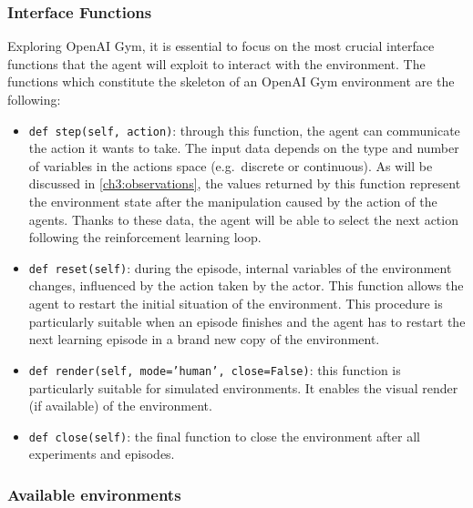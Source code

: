 \subsubsection{Interface Functions}

Exploring OpenAI Gym, it is essential to focus on the most crucial interface functions that the agent will exploit to interact with the environment.
The functions which constitute the skeleton of an OpenAI Gym environment are the following:
\begin{itemize}
	\item \texttt{def step(self, action)}: through this function, the agent can communicate the action it wants to take. The input data depends on the type and number of variables in the actions space (e.g.\ discrete or continuous). As will be discussed in \vref{ch3:observations}, the values returned by this function represent the environment state after the manipulation caused by the action of the agents. Thanks to these data, the agent will be able to select the next action following the reinforcement learning loop.
	\item \texttt{def reset(self)}: during the episode, internal variables of the environment changes, influenced by the action taken by the actor. This function allows the agent to restart the initial situation of the environment. This procedure is particularly suitable when an episode finishes and the agent has to restart the next learning episode in a brand new copy of the environment.
	\item \texttt{def render(self, mode='human', close=False)}: this function is particularly suitable for simulated environments. It enables the visual render (if available) of the environment.
	\item \texttt{def close(self)}: the final function to close the environment after all experiments and episodes.
\end{itemize}

\subsubsection{Available environments}

